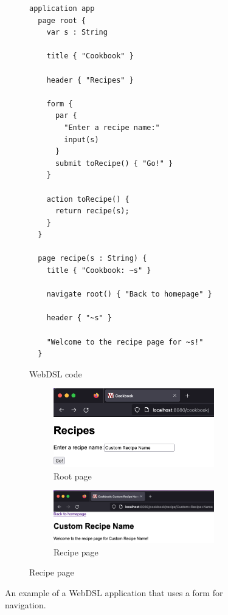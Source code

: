       \begin{figure}
        \begin{subfigure}[t]{0.45\textwidth}
          \begin{verbatim}
application app
  page root {
    var s : String

    title { "Cookbook" }

    header { "Recipes" }

    form {
      par {
        "Enter a recipe name:"
        input(s)
      }
      submit toRecipe() { "Go!" }
    }

    action toRecipe() {
      return recipe(s);
    }
  }

  page recipe(s : String) {
    title { "Cookbook: ~s" }

    navigate root() { "Back to homepage" }

    header { "~s" }

    "Welcome to the recipe page for ~s!"
  }
          \end{verbatim}
          \caption{\label{fig:webdsl-forms-webdsl}WebDSL code}
        \end{subfigure}
        \begin{subfigure}[t]{0.55\textwidth}
          \begin{subfigure}[t]{1\textwidth}
            \capstart
            \includegraphics[width=\textwidth]{../img/webdsl-forms-root}
            \caption{\label{fig:webdsl-forms-root-page}Root page}
          \end{subfigure}
          \begin{subfigure}[t]{1\textwidth}
            \capstart
            \includegraphics[width=\textwidth]{../img/webdsl-forms-recipe}
            \caption{\label{fig:webdsl-forms-recipe-page}Recipe page}
          \end{subfigure}
        \end{subfigure}
      \caption{\label{fig:webdsl-forms}An example of a WebDSL application that uses a form for navigation.}
      \end{figure}

